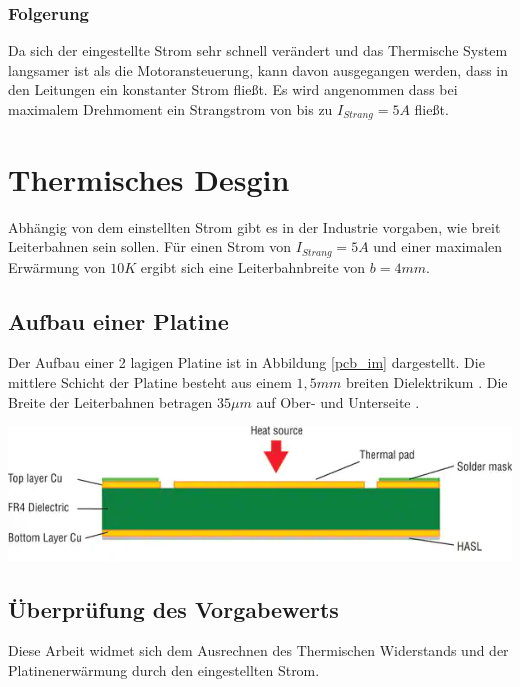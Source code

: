 \documentclass[10pt,a4paper,oneside,abstracton]{scrartcl}
\newenvironment{Figure}
  {\par\medskip\noindent\minipage{\linewidth}}
  {\endminipage\par\medskip}
\begin{document}
\begin{multicols}{2}
\subsubsection{Folgerung}
Da sich der eingestellte Strom sehr schnell verändert und das Thermische System langsamer ist als die Motoransteuerung, 
kann davon ausgegangen werden, dass in den Leitungen ein konstanter Strom fließt. 
Es wird angenommen dass bei maximalem Drehmoment ein Strangstrom von bis zu $I_{Strang} = 5 A $  fließt. 

\section{Thermisches Desgin}
Abhängig von dem einstellten Strom gibt es in der Industrie vorgaben, wie breit Leiterbahnen sein sollen.
Für einen Strom von $I_{Strang} = 5 A $ und einer maximalen Erwärmung von $10 K$ ergibt sich eine
Leiterbahnbreite von $b = 4 mm $.

\subsection*{Aufbau einer Platine}
Der Aufbau einer 2 lagigen Platine ist in Abbildung \ref*{pcb_im} dargestellt. 
\newline
Die mittlere Schicht der Platine besteht aus einem $ 1,5mm $ breiten Dielektrikum \cite{PCB_Querschnitt}. 
\newline
Die Breite der Leiterbahnen betragen $ 35 \mu m$ auf Ober- und Unterseite \cite{aisler}.


\begin{Figure}
	\includegraphics[width=\textwidth]{Bilder/PCB_Querschnitt.png}
	\label{pcb_im}
\end{Figure}

 \subsection*{Überprüfung des Vorgabewerts}
Diese Arbeit widmet sich dem Ausrechnen des Thermischen Widerstands und der 
Platinenerwärmung durch den eingestellten Strom. 


\end{multicols}
\end{document}
